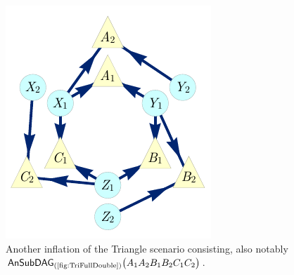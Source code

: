 \begin{figure}[h]
\begin{minipage}[t]{0.43\linewidth}
\end{minipage}
\hfill
\begin{minipage}[t]{0.3\linewidth}
\centering
\includegraphics[scale=1]{TriDagSub222fixedcoordALT.pdf}
\caption{Another inflation of the Triangle scenario consisting, also notably $\ansubgraph[(\textrm{\cref{fig:TriFullDouble}})]{A_1 A_2 B_1 B_2 C_1 C_2}$.}\label{fig:Tri222}
\end{minipage}
\end{figure}

